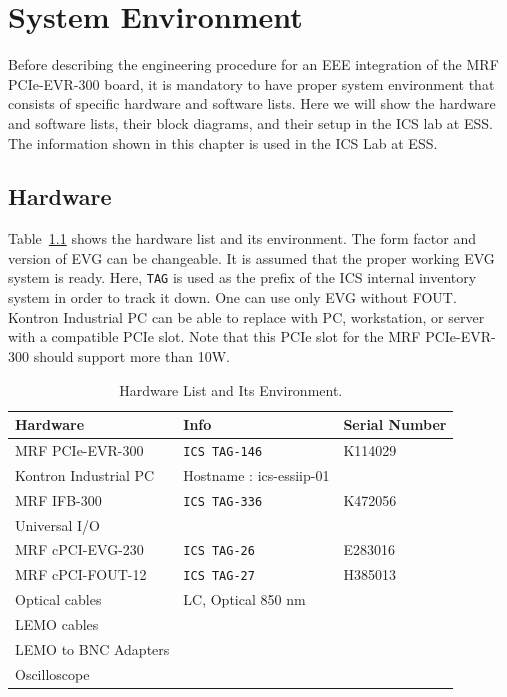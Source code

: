 \documentclass[11pt
  , a4paper
  , article
  , oneside
  , showtrims
]{memoir}
\begin{document}
\clearpage

\chapter{System Environment}
Before describing the engineering procedure for an EEE integration of the MRF PCIe-EVR-300 board, it is mandatory to have proper system environment that consists of specific hardware and software lists. Here we will show the hardware and software lists, their block diagrams, and their setup in the ICS lab at ESS. The information shown in this chapter is used in the ICS Lab at ESS.


\section{Hardware}
Table~\ref{table:hwlist} shows the hardware list and its environment. The form factor and version of EVG can be changeable. It is assumed that the proper working EVG system is ready. Here, \texttt{TAG} is used as the prefix of the ICS internal inventory system in order to track it down. One can use only EVG without FOUT. Kontron Industrial PC can be able to replace with PC, workstation, or server with a compatible PCIe slot. Note that this PCIe slot for the MRF PCIe-EVR-300 should support more than 10W.
\begin{table}[!hb]
  \centering
  \begin{tabular}{l|l|l}
    \toprule
    Hardware                  & Info                   & Serial Number \\\midrule
    MRF PCIe-EVR-300          & \texttt{ICS TAG-146}   & K114029       \\\midrule
    Kontron Industrial PC     & Hostname : ics-essiip-01&              \\\midrule
    MRF IFB-300               & \texttt{ICS TAG-336}   & K472056       \\\midrule
    Universal I/O             &                        &               \\\midrule
    MRF cPCI-EVG-230          & \texttt{ICS TAG-26}    & E283016       \\\midrule
    MRF cPCI-FOUT-12          & \texttt{ICS TAG-27}    & H385013       \\\midrule
    Optical cables            & LC, Optical 850 nm     &               \\\midrule
    LEMO cables               &                        &               \\\midrule
    LEMO to BNC Adapters      &                        &               \\\midrule
    Oscilloscope              &                        &               \\\bottomrule
  \end{tabular}
  \caption[]{Hardware List and Its Environment.}
  \label{table:hwlist}
\end{table}
\end{document}
